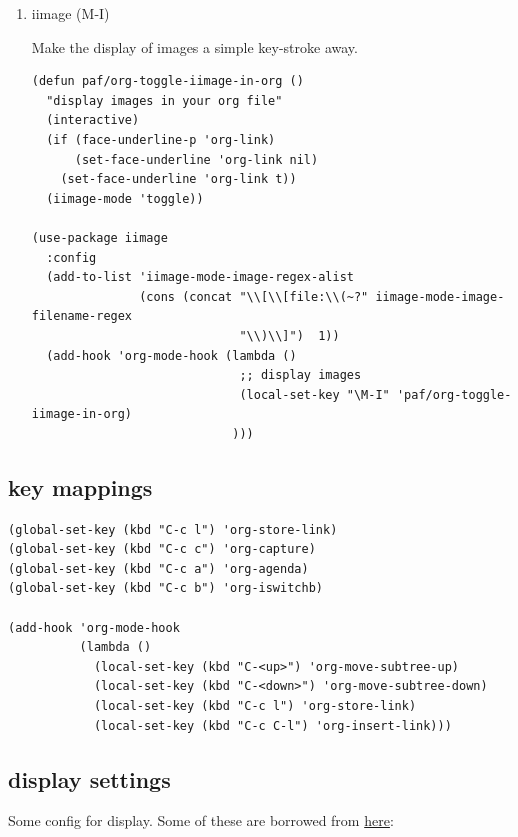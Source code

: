 \documentclass[11pt]{article}
\begin{document}
\begin{enumerate}
\begin{verbatim}
(use-package org-board
  :ensure t
  :config
  (global-set-key (kbd "C-c o") org-board-keymap))
\end{verbatim}

\item iimage (M-I)
\label{sec:org18af3e8}

Make the display of images a simple key-stroke away.

\begin{verbatim}
(defun paf/org-toggle-iimage-in-org ()
  "display images in your org file"
  (interactive)
  (if (face-underline-p 'org-link)
      (set-face-underline 'org-link nil)
    (set-face-underline 'org-link t))
  (iimage-mode 'toggle))

(use-package iimage
  :config
  (add-to-list 'iimage-mode-image-regex-alist
               (cons (concat "\\[\\[file:\\(~?" iimage-mode-image-filename-regex
                             "\\)\\]")  1))
  (add-hook 'org-mode-hook (lambda ()
                             ;; display images
                             (local-set-key "\M-I" 'paf/org-toggle-iimage-in-org)
                            )))
\end{verbatim}
\end{enumerate}

\subsection{key mappings}
\label{sec:org47e316d}

\begin{verbatim}
(global-set-key (kbd "C-c l") 'org-store-link)
(global-set-key (kbd "C-c c") 'org-capture)
(global-set-key (kbd "C-c a") 'org-agenda)
(global-set-key (kbd "C-c b") 'org-iswitchb)

(add-hook 'org-mode-hook
          (lambda ()
            (local-set-key (kbd "C-<up>") 'org-move-subtree-up)
            (local-set-key (kbd "C-<down>") 'org-move-subtree-down)
            (local-set-key (kbd "C-c l") 'org-store-link)
            (local-set-key (kbd "C-c C-l") 'org-insert-link)))

\end{verbatim}
\subsection{display settings}
\label{sec:org28630a0}
Some config for display. Some of these are borrowed from \href{https://zzamboni.org/post/beautifying-org-mode-in-emacs/}{here}:
\end{document}
